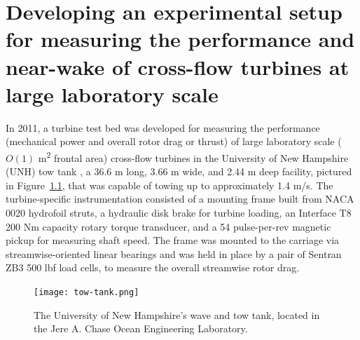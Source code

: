 \chapter{Developing an experimental setup for measuring the performance and
    near-wake of cross-flow turbines at large laboratory
    scale}\label{chap:exp-setup}

In 2011, a turbine test bed was developed for measuring the performance
(mechanical power and overall rotor drag or thrust) of large laboratory scale
($O(1)$ m\textsuperscript{2} frontal area) cross-flow turbines in the University
of New Hampshire (UNH) tow tank \cite{Bachant2011-MS}, a 36.6 m long, 3.66 m
wide, and 2.44 m deep facility, pictured in Figure~\ref{fig:tow-tank}, that was
capable of towing up to approximately 1.4 m/s. The turbine-specific
instrumentation consisted of a mounting frame built from NACA 0020 hydrofoil
struts, a hydraulic disk brake for turbine loading, an Interface T8 200 Nm
capacity rotary torque transducer, and a 54 pulse-per-rev magnetic pickup for
measuring shaft speed. The frame was mounted to the carriage via
streamwise-oriented linear bearings and was held in place by a pair of Sentran
ZB3 500 lbf load cells, to measure the overall streamwise rotor drag.

\begin{figure}[ht]
    \centering
    
    \texttt{[image: tow-tank.png]}
    
    \caption{The University of New Hampshire's wave and tow tank, located in the
        Jere A. Chase Ocean Engineering Laboratory.}
    
    \label{fig:tow-tank}
\end{figure}

